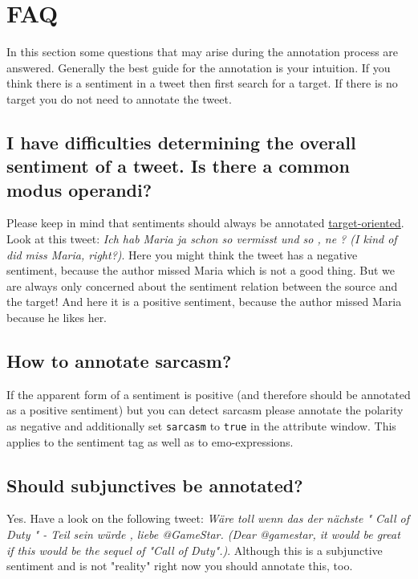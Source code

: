 \documentclass[11pt,a4paper]{article}
\begin{document}

\section{FAQ}
In this section some questions that may arise during the annotation process are answered. Generally the best guide for the annotation is your intuition. If you think there is a sentiment in a tweet then first search for a target. If there is no target you do not need to annotate the tweet.

\subsection{I have difficulties determining the overall sentiment of a tweet. Is there a common modus operandi?}
Please keep in mind that sentiments should always be annotated \underline{target-oriented}. Look at this tweet: \textit{Ich hab Maria ja schon so vermisst und so , ne ? (I kind of did miss Maria, right?)}. Here you might think the tweet has a negative sentiment, because the author missed Maria which is not a good thing. But we are always only concerned about the sentiment relation between the source and the target! And here it is a positive sentiment, because the author missed Maria because he likes her.

\subsection{How to annotate sarcasm?}
If the apparent form of a sentiment is positive (and therefore should be annotated as a positive sentiment) but you can detect sarcasm please annotate the polarity as negative and additionally set \texttt{sarcasm} to \texttt{true} in the attribute window. This applies to the sentiment tag as well as to emo-expressions.

\subsection{Should subjunctives be annotated?}
Yes. Have a look on the following tweet: \textit{W\"are toll wenn das der n\"achste " Call of Duty " - Teil sein w\"urde , liebe @GameStar. (Dear @gamestar, it would be great if this would be the sequel of "Call of Duty".)}. Although this is a subjunctive sentiment and is not "reality" right now you should annotate this, too.
\end{document}
